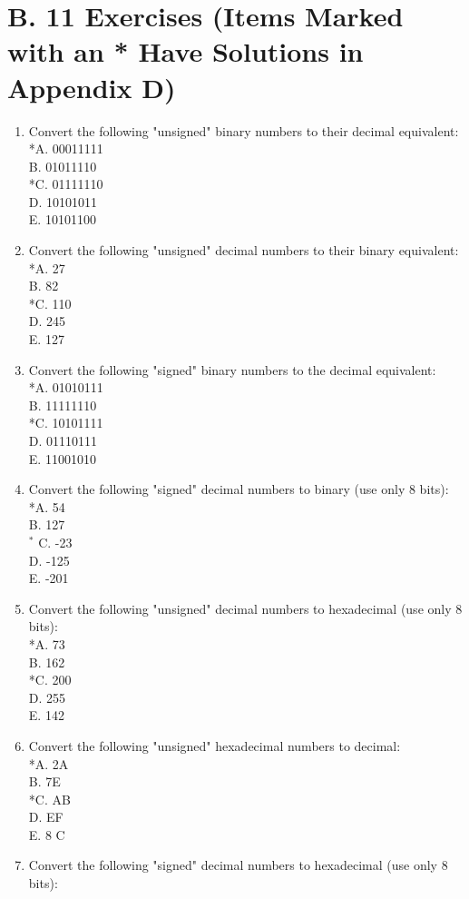 \documentclass[10pt]{article}
\begin{document}
\section*{B. 11 Exercises (Items Marked with an * Have Solutions in Appendix D)}
\begin{enumerate}
  \item Convert the following "unsigned" binary numbers to their decimal equivalent:\\
*A. 00011111\\
B. 01011110\\
*C. 01111110\\
D. 10101011\\
E. 10101100
  \item Convert the following "unsigned" decimal numbers to their binary equivalent:\\
*A. 27\\
B. 82\\
*C. 110\\
D. 245\\
E. 127
  \item Convert the following "signed" binary numbers to the decimal equivalent:\\
*A. 01010111\\
B. 11111110\\
*C. 10101111\\
D. 01110111\\
E. 11001010
  \item Convert the following "signed" decimal numbers to binary (use only 8 bits):\\
*A. 54\\
B. 127\\
${ }^{*}$ C. -23\\
D. -125\\
E. -201
  \item Convert the following "unsigned" decimal numbers to hexadecimal (use only 8 bits):\\
*A. 73\\
B. 162\\
*C. 200\\
D. 255\\
E. 142
  \item Convert the following "unsigned" hexadecimal numbers to decimal:\\
*A. 2A\\
B. 7E\\
*C. AB\\
D. EF\\
E. 8 C
  \item Convert the following "signed" decimal numbers to hexadecimal (use only 8 bits):\\

\end{enumerate}
\end{document}
